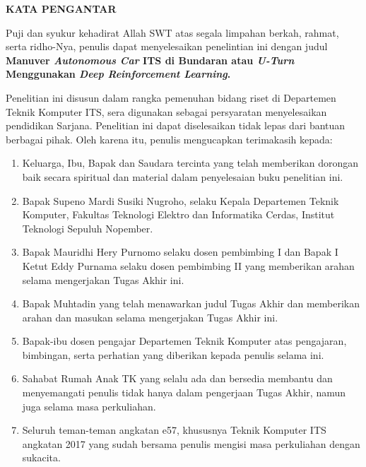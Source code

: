 \begin{center}
  \Large
  \textbf{KATA PENGANTAR}
\end{center}


\vspace{2ex}


Puji dan syukur kehadirat Allah SWT atas segala limpahan berkah, rahmat, serta ridho-Nya, penulis dapat menyelesaikan penelintian ini dengan judul \textbf{Manuver \textit{Autonomous Car }ITS di Bundaran atau \textit{U-Turn }Menggunakan \textit{Deep Reinforcement Learning}.}

Penelitian ini disusun dalam rangka pemenuhan bidang riset di Departemen Teknik Komputer ITS, sera digunakan sebagai persyaratan menyelesaikan pendidikan Sarjana. Penelitian ini dapat diselesaikan tidak lepas dari bantuan berbagai pihak. Oleh karena itu, penulis mengucapkan terimakasih kepada:

\begin{enumerate}[nolistsep]
	
	\item Keluarga, Ibu, Bapak dan Saudara tercinta yang telah memberikan dorongan baik secara spiritual dan material dalam penyelesaian buku penelitian ini. 
	
	\item Bapak Supeno Mardi Susiki Nugroho, selaku Kepala Departemen Teknik Komputer, Fakultas Teknologi Elektro dan Informatika Cerdas, Institut Teknologi Sepuluh Nopember.
	
	\item Bapak Mauridhi Hery Purnomo selaku dosen pembimbing I dan Bapak I Ketut Eddy Purnama selaku dosen pembimbing II yang memberikan arahan selama mengerjakan Tugas Akhir ini.

	\item Bapak Muhtadin yang telah menawarkan judul Tugas Akhir dan memberikan arahan dan masukan selama mengerjakan Tugas Akhir ini.

	\item Bapak-ibu dosen pengajar Departemen Teknik Komputer atas pengajaran, bimbingan, serta perhatian yang diberikan kepada penulis selama ini.
	
	\item Sahabat Rumah Anak TK yang selalu ada dan bersedia membantu dan menyemangati penulis tidak hanya dalam pengerjaan Tugas Akhir, namun juga selama masa perkuliahan.
	
	\item Seluruh teman-teman angkatan e57, khususnya Teknik Komputer ITS angkatan 2017 yang sudah bersama penulis mengisi masa perkuliahan dengan sukacita.
	
\end{enumerate}

